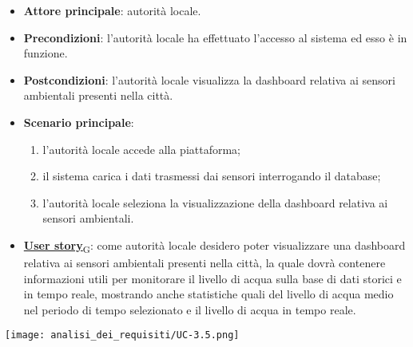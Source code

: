 \begin{itemize}
	\item \textbf{Attore principale}: autorità locale.
	\item \textbf{Precondizioni}: l'autorità locale ha effettuato l'accesso al sistema ed esso è in funzione.
	\item \textbf{Postcondizioni}: l'autorità locale visualizza la dashboard relativa
	      ai sensori ambientali presenti nella città.
	\item \textbf{Scenario principale}:
	      \begin{enumerate}
		      \item l'autorità locale accede alla piattaforma;
		      \item il sistema carica i dati trasmessi dai sensori interrogando il database;
		      \item l'autorità locale seleziona la visualizzazione della dashboard relativa ai sensori ambientali.
	      \end{enumerate}
	\item \href{https://7last.github.io/docs/pb/documentazione-interna/glossario\#user-story}{\textbf{User story}\textsubscript{G}}:
	      come autorità locale desidero poter visualizzare una dashboard relativa ai sensori ambientali presenti nella città, la quale
	      dovrà contenere informazioni utili per monitorare il livello di acqua sulla base di dati storici e in tempo reale, mostrando
	      anche statistiche quali del livello di acqua medio nel periodo di tempo selezionato e il livello di acqua in tempo reale.
\end{itemize}
\begin{center}
	\texttt{[image: analisi\_dei\_requisiti/UC-3.5.png]}
\end{center}


